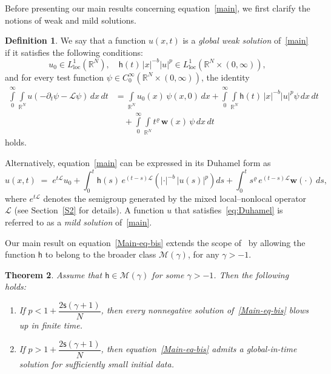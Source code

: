 \documentclass[12pt,reqno]{amsart}
\theoremstyle{plain}
\newtheorem{thm}{Theorem}[section]
\theoremstyle{definition}
\newtheorem{defi}[thm]{Definition}
\theoremstyle{remark}
\numberwithin{equation}{section}
\newcommand{\sL}{\mathscr{L}}
\newcommand{\h}{\mathsf h}
\newcommand{\ts}{\mathsf{s}}
\begin{document}
Before presenting our main results concerning equation~\eqref{main}, we first clarify the notions of weak and mild solutions.
\begin{defi}\label{defn:weak-solution}
We say that a function $u(x,t)$ is a \emph{global weak solution} of~\eqref{main} if it satisfies the following conditions:
$$
u_0 \in L^1_{\mathrm{loc}}(\mathbb{R}^N), \quad \h(t)\,|x|^{-b} |u|^p \in L^1_{\mathrm{loc}}(\mathbb{R}^N\times (0,\infty)),
$$
and for every test function $\psi \in C^\infty_0( \mathbb{R}^N\times (0,\infty))$, the identity
\begin{equation}
\label{W-S}
\begin{split}
\int\limits_0^\infty \int\limits_{\mathbb{R}^N} u(-\partial_t \psi - \sL \psi)\,dx\,dt 
&= \int\limits_{\mathbb{R}^N} u_0(x)\, \psi(x,0)\,dx 
+ \int\limits_0^\infty \int\limits_{\mathbb{R}^N} \h(t)\,|x|^{-b} |u|^p \psi\,dx\,dt \\
&\quad + \int\limits_0^\infty \int\limits_{\mathbb{R}^N} t^\varrho\, \mathbf{w}(x)\, \psi\, dx\,dt
\end{split}
\end{equation}
holds.
\end{defi}

Alternatively, equation~\eqref{main} can be expressed in its Duhamel form as  
\begin{equation}\label{eq:Duhamel}
u(x,t) \;=\; e^{t\sL} u_0 
+ \int_0^t \h(s)\, e^{(t-s)\sL}\!\left(|\cdot|^{-b}\,|u(s)|^p\right)ds 
+ \int_0^t s^\varrho \, e^{(t-s)\sL}\mathbf{w}(\cdot)\,ds,
\end{equation}
where $e^{t\sL}$ denotes the semigroup generated by the mixed local–nonlocal operator $\sL$ (see Section~\ref{S2} for details).  
A function $u$ that satisfies~\eqref{eq:Duhamel} is referred to as a \emph{mild solution} of~\eqref{main}.


Our main result on equation~\eqref{Main-eq-bis} extends the scope of~\cite[Corollary 7]{Migu-2025} by allowing the function $\h$ to belong to the broader class $\mathcal{M}(\gamma)$, for any $\gamma > -1$.
\begin{thm}
\label{Fuj-improve}
Assume that $\h \in \mathcal{M}(\gamma)$ for some $\gamma > -1$. Then the following holds:
\begin{enumerate}[label=(\roman*)]
    \item If $p < 1 + \dfrac{2\ts(\gamma + 1)}{N}$, then every nonnegative solution of~\eqref{Main-eq-bis} blows up in finite time.
    \item If $p > 1 + \dfrac{2\ts(\gamma + 1)}{N}$, then equation~\eqref{Main-eq-bis} admits a global-in-time solution for sufficiently small initial data.
\end{enumerate}
\end{thm}
\end{document}

